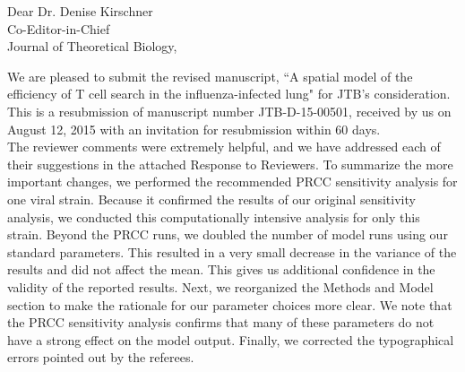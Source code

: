 \documentclass[10pt]{article}
\date{}
\begin{document}

\begin{flushleft}Dear Dr. Denise Kirschner \\
Co-Editor-in-Chief \\
Journal of Theoretical Biology, \end{flushleft} 


We are pleased to submit the revised manuscript, ``A spatial model of the efficiency of T cell search in the influenza-infected lung" for JTB's consideration. This is a resubmission of manuscript number JTB-D-15-00501, received by us on August 12, 2015 with an invitation for resubmission within 60 days. \\

The reviewer comments were extremely helpful, and we have addressed each of their suggestions in the attached Response to Reviewers.   To summarize the more important changes, we performed the recommended PRCC sensitivity analysis for one viral strain. Because it confirmed the results of our original sensitivity analysis, we conducted this computationally intensive analysis for only this strain.  Beyond the PRCC runs, we doubled the number of model runs using our standard parameters.  This resulted in a very small decrease in the variance of the results and did not affect the mean.  This gives us additional confidence in the validity of the reported results.  Next, we reorganized the Methods and Model section to make the rationale for our parameter choices more clear.  We note that the PRCC sensitivity analysis confirms that many of these parameters do not have a strong effect on the model output.  Finally, we corrected the typographical errors pointed out by the referees.   \\
\end{document}
